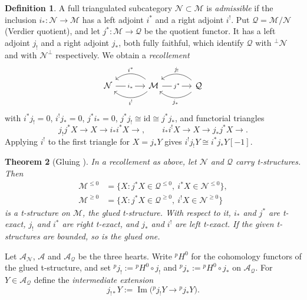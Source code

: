 \documentclass[11pt,reqno]{amsart}
\theoremstyle{plain}
\newtheorem{theorem}{Theorem}[section]
\theoremstyle{definition}
\newtheorem{definition}[theorem]{Definition}
\theoremstyle{remark}
\DeclareMathOperator{\im}{Im}
\newcommand{\cA}{\mathcal{A}}
\newcommand{\cN}{\mathcal{N}}
\newcommand{\cM}{\mathcal{M}}
\newcommand{\cQ}{\mathcal{Q}}
\newcommand{\pH}{{}^{p}\!H}
\begin{document}
\begin{definition}\label{def:recollement}
A full triangulated subcategory $\cN\subset\cM$ is \emph{admissible} if the inclusion $i_*\colon\cN\to\cM$ has a left adjoint $i^*$ and a right adjoint $i^!$. Put $\cQ=\cM/\cN$ (Verdier quotient), and let $j^*\colon\cM\to\cQ$ be the quotient functor. It has a left adjoint $j_!$ and a right adjoint $j_*$, both fully faithful, which identify $\cQ$ with ${}^\perp\cN$ and with $\cN^\perp$ respectively. We obtain a \emph{recollement}
\[
\begin{tikzcd}[column sep=large]
\cN \arrow[r,"i_*" description] & \cM \arrow[l,bend right=40,"i^*"'] \arrow[l,bend left=40,"i^!"] \arrow[r,"j^*" description] & \cQ \arrow[l,bend right=40,"j_!"'] \arrow[l,bend left=40,"j_*"]
\end{tikzcd}
\]
with $i^*j_!=0$, $i^!j_*=0$, $j^*i_*=0$, $j^*j_!\cong\mathrm{id}\cong j^*j_*$, and functorial triangles
\[ j_!j^*X\to X\to i_*i^*X\to,\qquad i_*i^!X\to X\to j_*j^*X\to.\]
Applying $i^!$ to the first triangle for $X=j_*Y$ gives $i^!j_!Y\cong i^*j_*Y[-1]$.
\end{definition}

\begin{theorem}[{Gluing \cite[Thm.~1.4.10 and \S1.4]{BBD82}}]\label{thm:gluing}
In a recollement as above, let $\cN$ and $\cQ$ carry t-structures. Then
\begin{align*}
\cM^{\le0}&=\{X: j^*X\in\cQ^{\le0},\ i^*X\in\cN^{\le0}\},\\
\cM^{\ge0}&=\{X: j^*X\in\cQ^{\ge0},\ i^!X\in\cN^{\ge0}\}
\end{align*}
is a t-structure on $\cM$, the \emph{glued t-structure}. With respect to it, $i_*$ and $j^*$ are t-exact, $j_!$ and $i^*$ are right t-exact, and $j_*$ and $i^!$ are left t-exact. If the given t-structures are bounded, so is the glued one.
\end{theorem}

Let $\cA_\cN$, $\cA$ and $\cA_\cQ$ be the three hearts. Write $\pH^0$ for the cohomology functors of the glued t-structure, and set ${}^p\!j_!:=\pH^0\circ j_!$ and ${}^p\!j_*:=\pH^0\circ j_*$ on $\cA_\cQ$. For $Y\in\cA_\cQ$ define the \emph{intermediate extension}
\[ j_{!*}Y:=\im\big({}^p\!j_!Y\to{}^p\!j_*Y\big). \]
\end{document}
